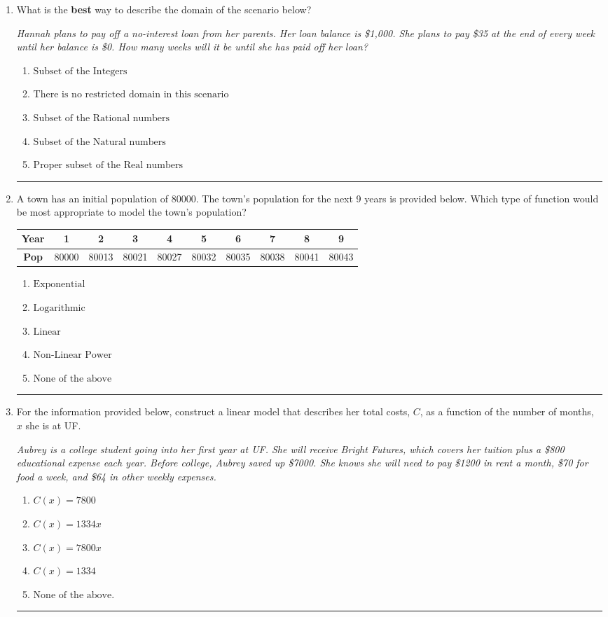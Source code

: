 \documentclass[14pt]{extbook}
\newcommand{\litem}[1]{\item#1\hspace*{-1cm}\rule{\textwidth}{0.4pt}}
\begin{document}
\begin{enumerate}
\litem{
What is the \textbf{best} way to describe the domain of the scenario below?
\begin{center}
    \textit{ Hannah plans to pay off a no-interest loan from her parents. Her loan balance is \$1,000. She plans to pay \$35 at the end of every week until her balance is \$0. How many weeks will it be until she has paid off her loan? }
\end{center}
\begin{enumerate}[label=\Alph*.]
\item \( \text{Subset of the Integers} \)
\item \( \text{There is no restricted domain in this scenario} \)
\item \( \text{Subset of the Rational numbers} \)
\item \( \text{Subset of the Natural numbers} \)
\item \( \text{Proper subset of the Real numbers} \)

\end{enumerate} }
\litem{
A town has an initial population of 80000. The town's population for the next 9 years is provided below. Which type of function would be most appropriate to model the town's population?

\begin{tabular}{c|c|c|c|c|c|c|c|c|c}
\textbf{Year} &1 &2 &3 &4 &5 &6 &7 &8 &9\tabularnewline \hline
\textbf{Pop} &80000 &80013 &80021 &80027 &80032 &80035 &80038 &80041 &80043\end{tabular}\begin{enumerate}[label=\Alph*.]
\item \( \text{Exponential} \)
\item \( \text{Logarithmic} \)
\item \( \text{Linear} \)
\item \( \text{Non-Linear Power} \)
\item \( \text{None of the above} \)

\end{enumerate} }
\litem{
For the information provided below, construct a linear model that describes her total costs, $C$, as a function of the number of months, $x$ she is at UF. 
\begin{center}
    \textit{ Aubrey is a college student going into her first year at UF. She will receive Bright Futures, which covers her tuition plus a \$800 educational expense each year. Before college, Aubrey saved up \$7000. She knows she will need to pay \$1200 in rent a month, \$70 for food a week, and \$64 in other weekly expenses. }
\end{center}
\begin{enumerate}[label=\Alph*.]
\item \( C(x) = 7800 \)
\item \( C(x) = 1334 x \)
\item \( C(x) = 7800 x \)
\item \( C(x) = 1334 \)
\item \( \text{None of the above.} \)


\end{enumerate}}
\end{enumerate}
\end{document}
